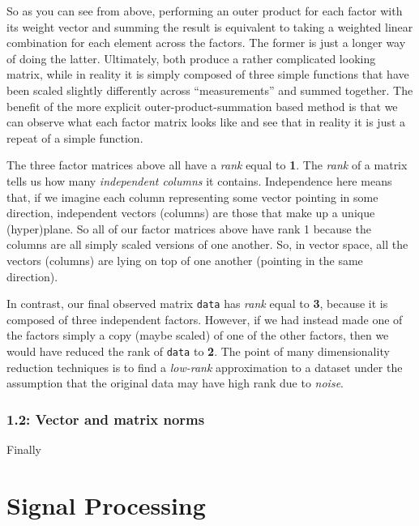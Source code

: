 \documentclass[11pt]{article}
\begin{document}
    So as you can see from above, performing an outer product for each
factor with its weight vector and summing the result is equivalent to
taking a weighted linear combination for each element across the
factors. The former is just a longer way of doing the latter.
Ultimately, both produce a rather complicated looking matrix, while in
reality it is simply composed of three simple functions that have been
scaled slightly differently across ``measurements'' and summed together.
The benefit of the more explicit outer-product-summation based method is
that we can observe what each factor matrix looks like and see that in
reality it is just a repeat of a simple function.

The three factor matrices above all have a \emph{rank} equal to
\textbf{1}. The \emph{rank} of a matrix tells us how many
\emph{independent columns} it contains. Independence here means that, if
we imagine each column representing some vector pointing in some
direction, independent vectors (columns) are those that make up a unique
(hyper)plane. So all of our factor matrices above have rank 1 because
the columns are all simply scaled versions of one another. So, in vector
space, all the vectors (columns) are lying on top of one another
(pointing in the same direction).

In contrast, our final observed matrix \texttt{data} has \emph{rank}
equal to \textbf{3}, because it is composed of three independent
factors. However, if we had instead made one of the factors simply a
copy (maybe scaled) of one of the other factors, then we would have
reduced the rank of \texttt{data} to \textbf{2}. The point of many
dimensionality reduction techniques is to find a \emph{low-rank}
approximation to a dataset under the assumption that the original data
may have high rank due to \emph{noise}.

    \hypertarget{vector-and-matrix-norms}{%
\subsubsection{1.2: Vector and matrix norms
}\label{vector-and-matrix-norms}}

Finally

    \hypertarget{signal-processing}{%
\section{Signal Processing }\label{signal-processing}}


    
    
    
    
\end{document}
